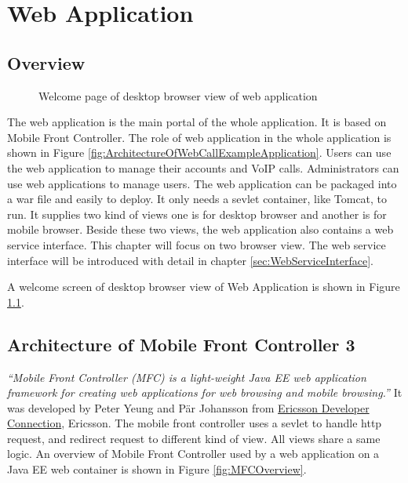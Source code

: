 
\chapter{Web Application}
\label{sec:WebApplication}

\section{Overview}
\label{sec:WebApplication:Overview}

\begin{figure}[!hbtp]
\centering
{}
\caption{Welcome page of desktop browser view of web application}
\label{fig:WelcomePageOfDesktopBrowserView}
\end{figure}

The web application is the main portal of the whole application. It is based on Mobile Front Controller. The role of web application in the whole application is shown in Figure \ref{fig:ArchitectureOfWebCallExampleApplication}. Users can use the web application to manage their accounts and VoIP calls. Administrators can use web applications to manage users. The web application can be packaged into a war file and easily to deploy. It only needs a sevlet container, like Tomcat, to run. It supplies two kind of views one is for desktop browser and another is for mobile browser. Beside these two views, the web application also contains a web service interface. This chapter will focus on two browser view. The web service interface will be introduced with detail in chapter \ref{sec:WebServiceInterface}.

A welcome screen of desktop browser view of Web Application is shown in Figure \ref{fig:WelcomePageOfDesktopBrowserView}.

\section{Architecture of Mobile Front Controller 3}
\label{sec:WebApplication:ArchitectureOfMobileFrontController3}

\textit{``Mobile Front Controller (MFC)\label{sym:MFC} is a light-weight Java EE web application framework for creating web applications for web browsing and mobile browsing.''}\cite{MobileFrontController} It was developed by Peter Yeung and P\"{a}r Johansson from \href{http://www.ericsson.com/developer/}{Ericsson Developer Connection}, Ericsson\cite{MobileFrontController}. The mobile front controller uses a sevlet to handle http request, and redirect request to different kind of view. All views share a same logic. An overview of Mobile Front Controller used by a web application on a Java EE web container is shown in Figure \ref{fig:MFCOverview}.

